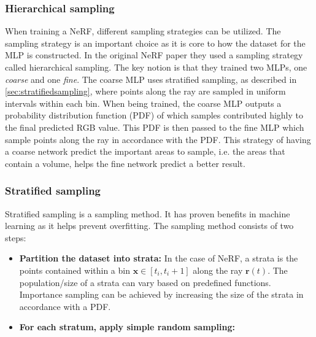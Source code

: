 \subsubsection{Hierarchical sampling} \label{sec:hierarchicalsampling}
When training a NeRF, different sampling strategies can be utilized. The sampling strategy is an important choice as it is core to how the dataset for the MLP is constructed. In the original NeRF paper they used a sampling strategy called hierarchical sampling. The key notion is that they trained two MLPs, one \textit{coarse} and one \textit{fine}. The coarse MLP uses stratified sampling, as described in \autoref{sec:stratifiedsampling}, where points along the ray are sampled in uniform intervals within each bin. When being trained, the coarse MLP outputs a probability distribution function (PDF) of which samples contributed highly to the final predicted RGB value. This PDF is then passed to the fine MLP which sample points along the ray in accordance with the PDF. This strategy of having a coarse network predict the important areas to sample, i.e. the areas that contain a volume, helps the fine network predict a better result. \cite{mildenhall_nerf_2020}


\subsubsection{Stratified sampling} \label{sec:stratifiedsampling}
Stratified sampling is a sampling method. It has proven benefits in machine learning as it helps prevent overfitting. The sampling method consists of two steps:

\begin{itemize}
    \item \textbf{Partition the dataset into strata:} In the case of NeRF, a strata is the points contained within a bin $\pmb{x} \in [t_i, t_i+1]$ along the ray $\pmb{r}(t)$. The population/size of a strata can vary based on predefined functions. Importance sampling can be achieved by increasing the size of the strata in accordance with a PDF.
    \item \textbf{For each stratum, apply simple random sampling:} 
\end{itemize}

